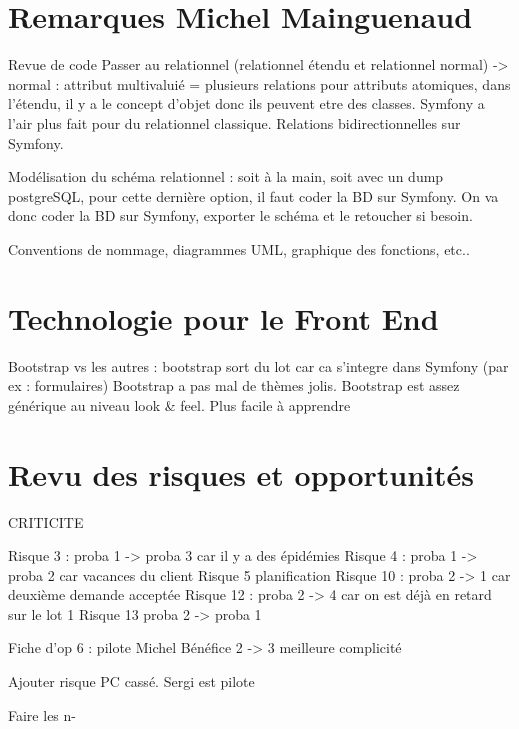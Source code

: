 \documentclass [a4paper] {article}
\begin{document}
\section{Remarques Michel Mainguenaud}
Revue de code
Passer au relationnel (relationnel étendu et relationnel normal) -> normal : attribut multivaluié = plusieurs relations pour attributs atomiques, dans l'étendu, il y a le concept d'objet donc ils peuvent etre des classes. Symfony a l'air plus fait pour du relationnel classique. Relations bidirectionnelles sur Symfony.

Modélisation du schéma relationnel : soit à la main, soit avec un dump postgreSQL, pour cette dernière option, il faut coder la BD sur Symfony. On va donc coder la BD sur Symfony, exporter le schéma et le retoucher si besoin.

Conventions de nommage, diagrammes UML, graphique des fonctions, etc..


\section{Technologie pour le Front End}
Bootstrap vs les autres : bootstrap sort du lot car ca s'integre dans Symfony (par ex : formulaires) Bootstrap a pas mal de thèmes jolis.
Bootstrap est assez générique au niveau look & feel. 
Plus facile à apprendre


\section{Revu des risques et opportunités}
CRITICITE

Risque 3 : proba 1 -> proba 3 car il y a des épidémies
Risque 4 : proba 1 -> proba 2 car vacances du client
Risque 5 planification
Risque 10 : proba 2 -> 1 car deuxième demande acceptée
Risque 12 : proba 2 -> 4 car on est déjà en retard sur le lot 1
Risque 13 proba 2 -> proba 1

Fiche d'op 6 : pilote Michel Bénéfice 2 -> 3 meilleure complicité

Ajouter risque PC cassé. Sergi est pilote 


Faire les n-






\end{document}
